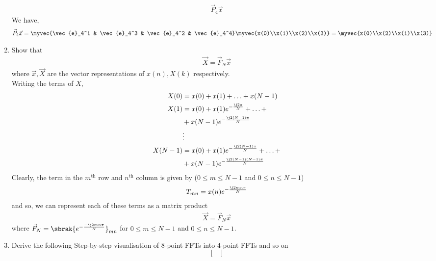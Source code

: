 \documentclass[journal,12pt,twocolumn]{IEEEtran}
\renewcommand\thesection{\arabic{section}}
\begin{document}
\begin{enumerate}[label=\arabic*.,ref=\thesection.\theenumi]
    \begin{align}
	     \vec{P}_4 \vec{x}
    \end{align}
	\solution We have,
	\begin{align}
		\vec{P}_4\vec{x} = \myvec{\vec{e}_4^1 & \vec{e}_4^3 & \vec{e}_4^2 & \vec{e}_4^4}\myvec{x(0)\\x(1)\\x(2)\\x(3)} = \myvec{x(0)\\x(2)\\x(1)\\x(3)}
		\label{eq:x-permute}
	\end{align}
\item Show that 
    \begin{align}
	    \vec{X} = \vec{F}_N \vec{x}
	    \label{eq:dft-mat-def}
    \end{align}
		where $\vec{x}, \vec{X}$ are the vector representations of $x(n), X(k)$ respectively.
		\\
		\solution Writing the terms of $X$, 
		\begin{align}
			X(0) &= x(0) + x(1) + \ldots + x(N - 1) \\
			X(1) &= x(0) + x(1)e^{-\frac{\j2\pi}{N}} + \ldots + \nonumber \\
				 &+ x(N - 1)e^{-\frac{\j2(N - 1)\pi}{N}} \\
				 &\vdots \nonumber \\
			X(N - 1) &= x(0) + x(1)e^{-\frac{\j2(N - 1)\pi}{N}} + \ldots + \nonumber \\
					 &+ x(N - 1)e^{-\frac{\j2(N - 1)(N - 1)\pi}{N}}	
		\end{align}
		Clearly, the term in the $m^{\text{th}}$ row and $n^{\text{th}}$ column is given by ($0 \leq m \leq N - 1$ and $0 \leq n \leq N - 1$) 
		\begin{align}
			T_{mn} = x(n)e^{-\frac{\j2mn\pi}{N}} 
		\end{align}
		and so, we can represent each of these terms as a matrix product
		\begin{align}
			\vec{X} = \vec{F}_N\vec{x}
		\end{align}
		where $\vec{F}_N = \sbrak{e^{-\frac{-\j2mn\pi}{N}}}_{mn}$ for $0 \leq m \leq N - 1$ and $0 \leq n \leq N - 1$. 
\\
\item Derive the following Step-by-step visualisation  of
8-point FFTs into 4-point FFTs and so on
\begin{equation}
\begin{bmatrix}

\end{bmatrix}
\end{equation}
\end{enumerate}
\end{document}
